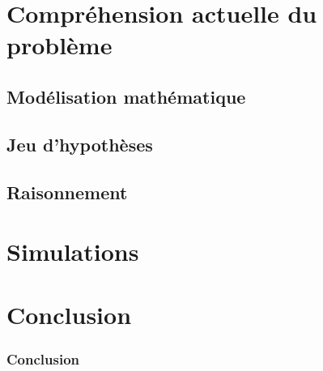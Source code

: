 \documentclass[french]{beamer}
\begin{document}
\section{Compréhension actuelle du problème}
\subsection{Modélisation mathématique}
\subsection{Jeu d'hypothèses}
\subsection{Raisonnement}

\section{Simulations}

\section{Conclusion}
\begin{frame}
\frametitle{Conclusion}
\end{frame}


\begin{frame}
\end{frame} %
\end{document}
